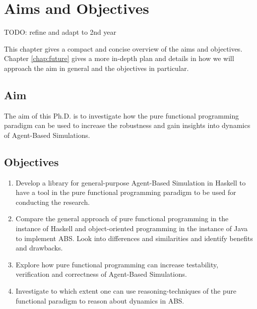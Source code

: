 \chapter{Aims and Objectives}
\label{chap:aimsObj}

TODO: refine and adapt to 2nd year

This chapter gives a compact and concise overview of the aims and objectives. Chapter \ref{chap:future} gives a more in-depth plan and details in how we will approach the aim in general and the objectives in particular.

\section{Aim}
The aim of this Ph.D. is to investigate how the pure functional programming paradigm can be used to increase the robustness and gain insights into dynamics of Agent-Based Simulations.

\section{Objectives}
\begin{enumerate}
	\item Develop a library for general-purpose Agent-Based Simulation in Haskell to have a tool in the pure functional programming paradigm to be used for conducting the research.

	\item Compare the general approach of pure functional programming in the instance of Haskell and object-oriented programming in the instance of Java to implement ABS. Look into differences and similarities and identify benefits and drawbacks.

	\item Explore how pure functional programming can increase testability, verification and correctness of Agent-Based Simulations.

	\item Investigate to which extent one can use reasoning-techniques of the pure functional paradigm to reason about dynamics in ABS.
\end{enumerate}